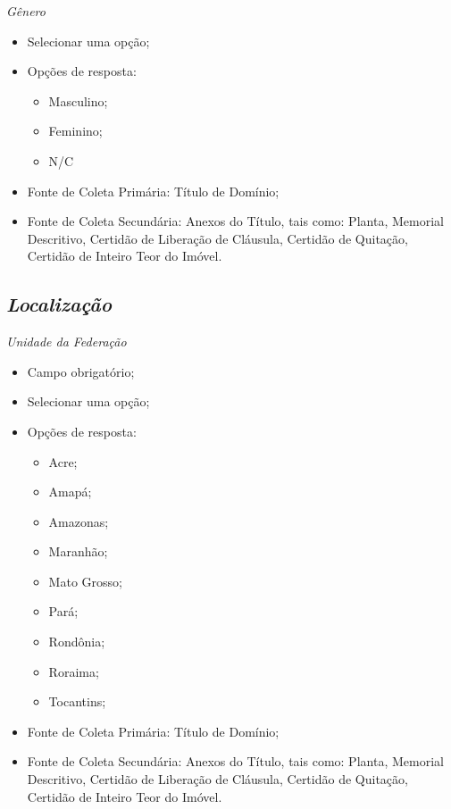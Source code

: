 \documentclass[
  letterpaper,
]{report}
\providecommand{\tightlist}{%
  \setlength{\itemsep}{0pt}\setlength{\parskip}{0pt}}\usepackage{longtable,booktabs,array}
\begin{document}
\emph{Gênero}

\begin{itemize}
\tightlist
\item
  Selecionar uma opção;
\item
  Opções de resposta:

  \begin{itemize}
  \tightlist
  \item
    Masculino;
  \item
    Feminino;
  \item
    N/C
  \end{itemize}
\item
  Fonte de Coleta Primária: Título de Domínio;
\item
  Fonte de Coleta Secundária: Anexos do Título, tais como: Planta,
  Memorial Descritivo, Certidão de Liberação de Cláusula, Certidão de
  Quitação, Certidão de Inteiro Teor do Imóvel.
\end{itemize}

\hypertarget{localizauxe7uxe3o}{%
\subsection{\texorpdfstring{\emph{Localização}}{Localização}}\label{localizauxe7uxe3o}}

\emph{Unidade da Federação}

\begin{itemize}
\tightlist
\item
  Campo obrigatório;
\item
  Selecionar uma opção;
\item
  Opções de resposta:

  \begin{itemize}
  \tightlist
  \item
    Acre;
  \item
    Amapá;
  \item
    Amazonas;
  \item
    Maranhão;
  \item
    Mato Grosso;
  \item
    Pará;
  \item
    Rondônia;
  \item
    Roraima;
  \item
    Tocantins;
  \end{itemize}
\item
  Fonte de Coleta Primária: Título de Domínio;
\item
  Fonte de Coleta Secundária: Anexos do Título, tais como: Planta,
  Memorial Descritivo, Certidão de Liberação de Cláusula, Certidão de
  Quitação, Certidão de Inteiro Teor do Imóvel.
\end{itemize}
\end{document}

